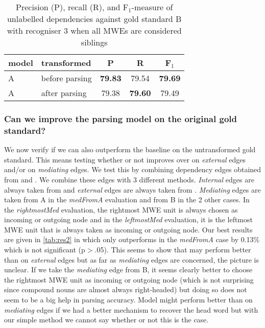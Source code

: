 \documentclass[output=paper]{LSP/langsci}
\begin{document}
\begin{table}[H]
    \footnotesize
    \def\arraystretch{1.20} 
    \centering
    \begin{tabular}{| l | l | c | c | c |} \hline
        \textbf{model}
        & \textbf{transformed}
        & \textbf{P}
        & \textbf{R}
        & \textbf{F$_1$}
        \\ \hline
        A & before parsing &\textbf{79.83} & 79.54  & \textbf{79.69} \\
        A & after parsing &79.38  &\textbf{79.60}  & 79.49 \\
        \hline
    \end{tabular}
    \caption{Precision (P), recall (R), and F$_1$-measure of unlabelled dependencies against gold standard B with recogniser 3 when all MWEs are considered siblings \label{tab:res1tris}}
\end{table}

\subsubsection{Can we improve the parsing model on the original gold standard?}
\indent We now verify if we can also outperform the baseline on the untransformed gold standard. This means testing whether or not \modelB improves over \modelA on \textit{external} edges and/or on \textit{mediating} edges. We test this by combining dependency edges obtained from \modelA and \modelB. We combine these edges with 3 different methods. \textit{Internal} edges are always taken from \modelA and \textit{external} edges are always taken from \modelB. \textit{Mediating} edges are taken from A in the \textit{medFromA} evaluation and from B in the 2 other cases. In the \textit{rightmostMed} evaluation, the rightmost MWE unit is always chosen as incoming or outgoing node and in the \textit{leftmostMed} evaluation, it is the leftmost MWE unit that is always taken as incoming or outgoing node. Our best results are given in \ref{tab:res2} in which \modelB only outperforms \modelA in the \textit{medFromA} case by 0.13\% which is not significant (p$>$.05). This seems to show that \modelB may perform better than \modelA on \textit{external} edges but as far as \textit{mediating} edges are concerned, the picture is unclear. If we take the \textit{mediating} edge from B, it seems clearly better to choose the rightmost MWE unit as incoming or outgoing node (which is not surprising since compound nouns are almost always right-headed) but doing so does not seem to be a big help in parsing accuracy. Model might perform better than \modelA on \textit{mediating} edges if we had a better mechanism to recover the head word but with our simple method we cannot say whether or not this is the case.
\end{document}
